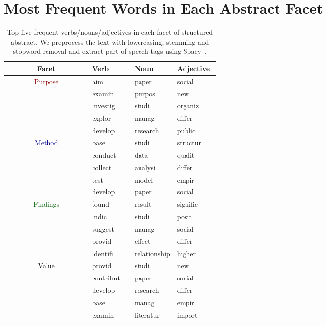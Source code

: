 \documentclass[11pt,a4paper]{article}
\newcommand{\absp}{\textcolor{darkred}{Purpose}\xspace}
\newcommand{\absm}{\textcolor{darkblue}{Method}\xspace}
\newcommand{\absf}{\textcolor{darkgreen}{Findings}\xspace}
\newcommand{\absv}{\textcolor{darkyellow}{Value}\xspace}
\begin{document}
\section{Most Frequent Words in Each Abstract Facet}
\label{sec:top_word_each_facet}
\begin{table}[!ht]
    \centering
    \fontsize{10}{10}\selectfont 
    \begin{tabular}{c  p{0.2\linewidth}  p{0.2\linewidth}  p{0.2\linewidth}}
        \toprule\midrule
        \textbf{Facet} & \textbf{Verb}  & \textbf{Noun}  & \textbf{Adjective} \\ 
        \midrule
        \absp 
        & aim  &   paper   &   social     \\
        & examin   &   purpos   &  new     \\
        & investig &	studi &	organiz	  \\
        & explor &	manag &	differ		  \\
        & develop &      research &    public \\
        \midrule 
        \absm 
        & base &         studi &  structur	     \\
        & conduct &          data &    qualit	 \\
        & collect &       analysi &    differ	  \\
        & test &         model &     empir	  \\
        & develop &         paper &    social  \\
        \midrule
        \absf
        & found &        result &  signific     \\
        & indic &         studi &     posit     \\
        & suggest &         manag &    social	 \\
        & provid &        effect &    differ	 \\
        & identifi &  relationship &    higher	 \\
        \midrule
        \absv
        & provid &         studi &       new    \\
        & contribut &         paper &    social  \\
        & develop &      research &    differ  \\
        & base &         manag &     empir	  \\
        & examin &     literatur &    import  \\
        \bottomrule
    \end{tabular}
    \caption{Top five frequent verbs/nouns/adjectives in each facet of structured abstract. We preprocess the text with lowercasing, stemming and stopword removal and extract part-of-speech tags using Spacy~\cite{spacy}.}
\end{table}
\end{document}
